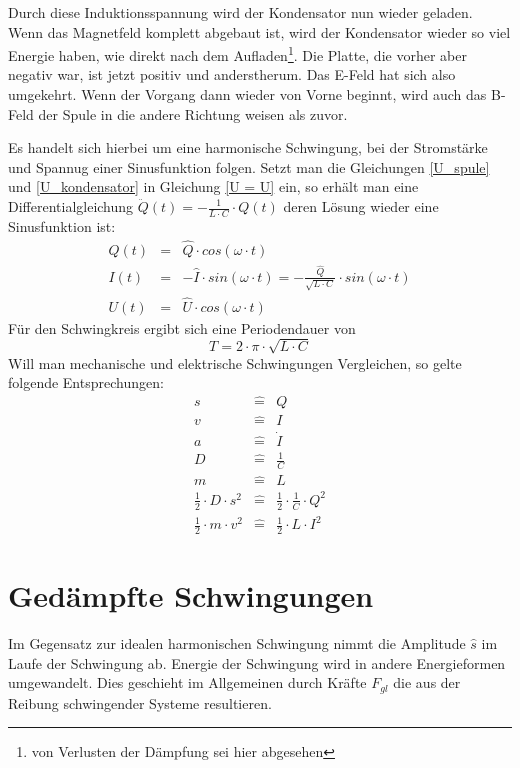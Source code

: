 Durch diese Induktionsspannung wird der Kondensator nun wieder geladen. Wenn das Magnetfeld komplett abgebaut ist, wird der Kondensator wieder so viel Energie haben, wie direkt nach dem Aufladen\footnote{von Verlusten der Dämpfung sei hier abgesehen}. Die Platte, die vorher aber negativ war, ist jetzt positiv und anderstherum. Das E-Feld hat sich also umgekehrt. Wenn der Vorgang dann wieder von Vorne beginnt, wird auch das B-Feld der Spule in die andere Richtung weisen als zuvor.

Es handelt sich hierbei um eine harmonische Schwingung, bei der Stromstärke und Spannug einer Sinusfunktion folgen. Setzt man die Gleichungen \ref{U_spule} und \ref{U_kondensator} in Gleichung \ref{U = U} ein, so erhält man eine Differentialgleichung \(\ddot{Q}(t) = - \frac{1}{L \cdot C} \cdot Q(t)\) deren Lösung wieder eine Sinusfunktion ist:
	\begin{eqnarray}
		Q(t) &=& \hat{Q} \cdot cos(\omega \cdot t)
			\label{schwingkreis_Q} \\
		I(t) &=& - \hat{I} \cdot sin(\omega \cdot t)  = - \frac{\hat{Q}}{\sqrt{L \cdot C}} \cdot sin(\omega \cdot t) \\
		U(t) &=& \hat{U} \cdot cos(\omega \cdot t)
	\end{eqnarray}
Für den Schwingkreis ergibt sich eine Periodendauer von
	\begin{equation}
		T = 2 \cdot \pi \cdot \sqrt{L \cdot C}
	\end{equation}
Will man mechanische und elektrische Schwingungen Vergleichen, so gelte folgende Entsprechungen:
	\begin{eqnarray*}
	s 	& \widehat{=} & Q \\
	v 	& \widehat{=} & I \\
	a & \widehat{=} & \dot{I} \\
	D & \widehat{=} & \frac{1}{C} \\
	m & \widehat{=} & L \\
	\frac{1}{2} \cdot D \cdot s^2 & \widehat{=} & \frac{1}{2} \cdot  \frac{1}{C} \cdot  Q^2 \\
	\frac{1}{2}  \cdot m  \cdot v^2 	& \widehat{=} & \frac{1}{2}  \cdot L  \cdot I^2 
	\end{eqnarray*}


				\chapter{Gedämpfte Schwingungen}

Im Gegensatz zur idealen harmonischen Schwingung nimmt die Amplitude \(\hat{s}\) im Laufe der Schwingung ab. Energie der Schwingung wird in andere Energieformen umgewandelt. Dies geschieht im Allgemeinen durch Kräfte \(F_{gl}\) die aus der Reibung schwingender Systeme resultieren. 

